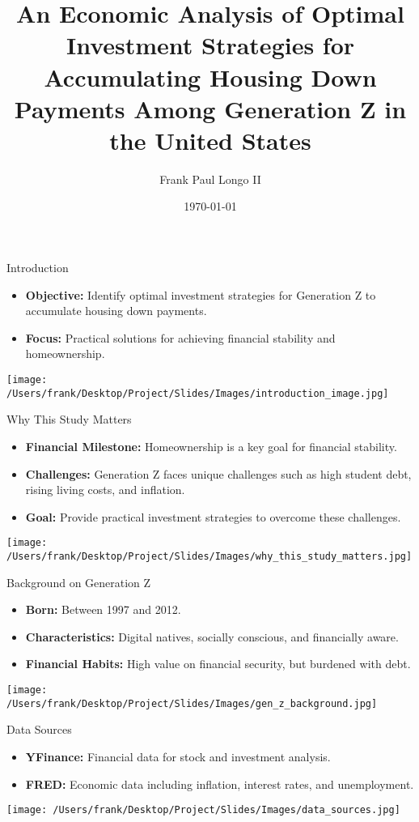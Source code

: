 \documentclass{beamer}
\title{An Economic Analysis of Optimal Investment Strategies for Accumulating Housing Down Payments Among Generation Z in the United States}
\author{Frank Paul Longo II}
\date{\today}
\begin{document}
\frame{\titlepage}

\begin{frame}{Introduction}
    \begin{itemize}
        \item \textbf{Objective:} Identify optimal investment strategies for Generation Z to accumulate housing down payments.
        \item \textbf{Focus:} Practical solutions for achieving financial stability and homeownership.
    \end{itemize}
    \centering
    \texttt{[image: /Users/frank/Desktop/Project/Slides/Images/introduction\_image.jpg]}
\end{frame}

\begin{frame}{Why This Study Matters}
    \begin{itemize}
        \item \textbf{Financial Milestone:} Homeownership is a key goal for financial stability.
        \item \textbf{Challenges:} Generation Z faces unique challenges such as high student debt, rising living costs, and inflation.
        \item \textbf{Goal:} Provide practical investment strategies to overcome these challenges.
    \end{itemize}
    \centering
    \texttt{[image: /Users/frank/Desktop/Project/Slides/Images/why\_this\_study\_matters.jpg]}
\end{frame}

\begin{frame}{Background on Generation Z}
    \begin{itemize}
        \item \textbf{Born:} Between 1997 and 2012.
        \item \textbf{Characteristics:} Digital natives, socially conscious, and financially aware.
        \item \textbf{Financial Habits:} High value on financial security, but burdened with debt.
    \end{itemize}
    \centering
    \texttt{[image: /Users/frank/Desktop/Project/Slides/Images/gen\_z\_background.jpg]}
\end{frame}

\begin{frame}{Data Sources}
    \begin{itemize}
        \item \textbf{YFinance:} Financial data for stock and investment analysis.
        \item \textbf{FRED:} Economic data including inflation, interest rates, and unemployment.
    \end{itemize}
    \centering
    \texttt{[image: /Users/frank/Desktop/Project/Slides/Images/data\_sources.jpg]}
\end{frame}
\end{document}
